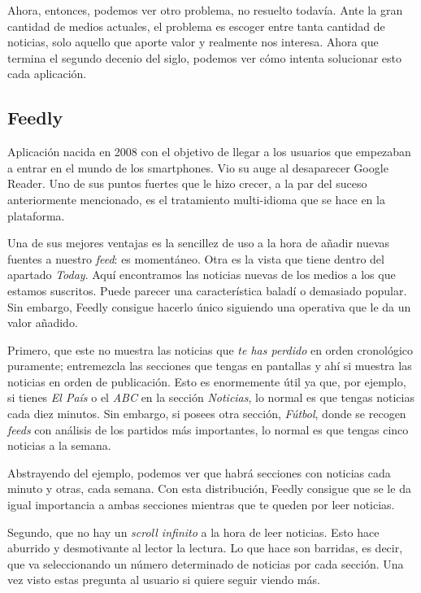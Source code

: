 Ahora, entonces, podemos ver otro problema, no resuelto todavía. Ante la gran cantidad de medios actuales, el problema es escoger entre tanta cantidad de noticias, solo aquello que aporte valor y realmente nos interesa. Ahora que termina el segundo decenio del siglo, podemos ver cómo intenta solucionar esto cada aplicación.

\subsection{Feedly}

Aplicación nacida en 2008 con el objetivo de llegar a los usuarios que empezaban a entrar en el mundo de los smartphones. Vio su auge al desaparecer Google Reader. Uno de sus puntos fuertes que le hizo crecer, a la par del suceso anteriormente mencionado, es el tratamiento multi-idioma que se hace en la plataforma.


Una de sus mejores ventajas es la sencillez de uso a la hora de añadir nuevas fuentes a nuestro \textit{feed}: es momentáneo. Otra es la vista que tiene dentro del apartado \textit{Today}. Aquí encontramos las noticias nuevas de los medios a los que estamos suscritos. Puede parecer una característica baladí o demasiado popular. Sin embargo, Feedly consigue hacerlo único siguiendo una  operativa que le da un valor añadido.

Primero, que este no muestra las noticias que \textit{te has perdido} en orden cronológico puramente; entremezcla las secciones que tengas en pantallas y ahí si muestra las noticias en orden de publicación. Esto es enormemente útil ya que, por ejemplo, si tienes \textit{El País} o el \textit{ABC} en la sección \textit{Noticias}, lo normal es que tengas noticias cada diez minutos. Sin embargo, si posees otra sección, \textit{Fútbol}, donde se recogen \textit{feeds} con análisis de los partidos más importantes, lo normal es que tengas cinco noticias a la semana.

Abstrayendo del ejemplo, podemos ver que habrá secciones con noticias cada minuto y otras, cada semana. Con esta distribución, Feedly consigue que se le da igual importancia a ambas secciones mientras que te queden por leer noticias.

Segundo, que no hay un \textit{scroll infinito} a la hora de leer noticias. Esto hace aburrido y desmotivante al lector la lectura. Lo que hace son barridas, es decir, que va seleccionando un número determinado de noticias por cada sección. Una vez visto estas pregunta al usuario si quiere seguir viendo más.

